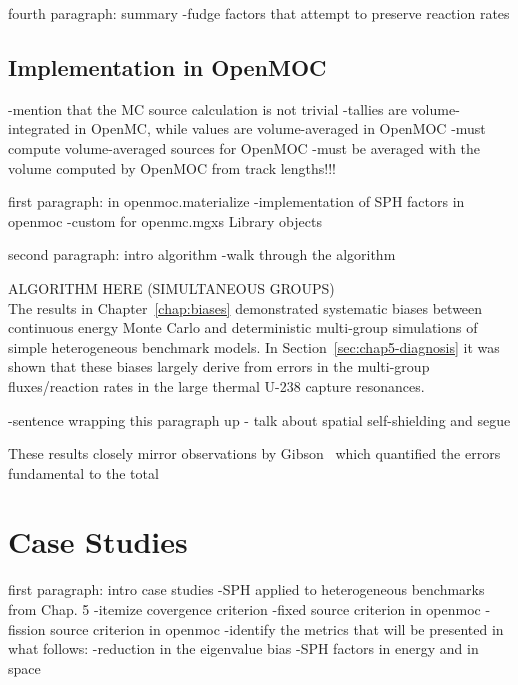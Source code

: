 
fourth paragraph: summary
-fudge factors that attempt to preserve reaction rates


\subsection{Implementation in OpenMOC}
\label{subsec:chap6-sph-openmoc}

-mention that the MC source calculation is not trivial
-tallies are volume-integrated in OpenMC, while values are volume-averaged in OpenMOC
-must compute volume-averaged sources for OpenMOC
  -must be averaged with the volume computed by OpenMOC from track lengths!!!

first paragraph: in openmoc.materialize
-implementation of SPH factors in openmoc
-custom for openmc.mgxs Library objects

second paragraph: intro algorithm
-walk through the algorithm

ALGORITHM HERE (SIMULTANEOUS GROUPS)\\


The results in Chapter~\ref{chap:biases} demonstrated systematic biases between continuous energy Monte Carlo and deterministic multi-group simulations of simple heterogeneous benchmark models. In Section~\ref{sec:chap5-diagnosis} it was shown that these biases largely derive from errors in the multi-group fluxes/reaction rates in the large thermal U-238 capture resonances. 

-sentence wrapping this paragraph up - talk about spatial self-shielding and segue

These results closely mirror observations by Gibson~\cite{gibson2016thesis} which quantified the errors fundamental to the total 


\section{Case Studies}
\label{sec:chap6-sph-case-studies}

first paragraph: intro case studies
-SPH applied to heterogeneous benchmarks from Chap. 5
-itemize covergence criterion
-fixed source criterion in openmoc
-fission source criterion in openmoc
-identify the metrics that will be presented in what follows:
  -reduction in the eigenvalue bias
  -SPH factors in energy and in space

